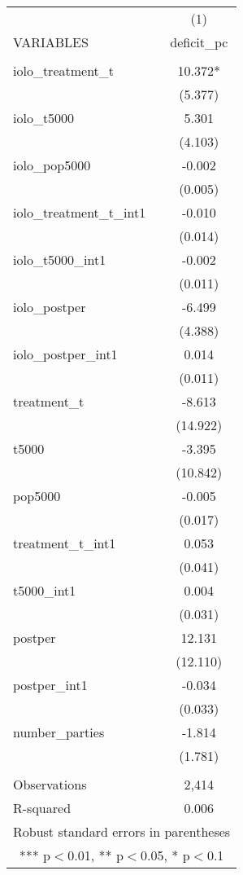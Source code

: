\documentclass[]{article}
\begin{document}
\begin{tabular}{lc} \hline
 & (1) \\
VARIABLES & deficit\_pc \\ \hline
 &  \\
iolo\_treatment\_t & 10.372* \\
 & (5.377) \\
iolo\_t5000 & 5.301 \\
 & (4.103) \\
iolo\_pop5000 & -0.002 \\
 & (0.005) \\
iolo\_treatment\_t\_int1 & -0.010 \\
 & (0.014) \\
iolo\_t5000\_int1 & -0.002 \\
 & (0.011) \\
iolo\_postper & -6.499 \\
 & (4.388) \\
iolo\_postper\_int1 & 0.014 \\
 & (0.011) \\
treatment\_t & -8.613 \\
 & (14.922) \\
t5000 & -3.395 \\
 & (10.842) \\
pop5000 & -0.005 \\
 & (0.017) \\
treatment\_t\_int1 & 0.053 \\
 & (0.041) \\
t5000\_int1 & 0.004 \\
 & (0.031) \\
postper & 12.131 \\
 & (12.110) \\
postper\_int1 & -0.034 \\
 & (0.033) \\
number\_parties & -1.814 \\
 & (1.781) \\
 &  \\
Observations & 2,414 \\
 R-squared & 0.006 \\ \hline
\multicolumn{2}{c}{ Robust standard errors in parentheses} \\
\multicolumn{2}{c}{ *** p$<$0.01, ** p$<$0.05, * p$<$0.1} \\
\end{tabular}
\end{document}
